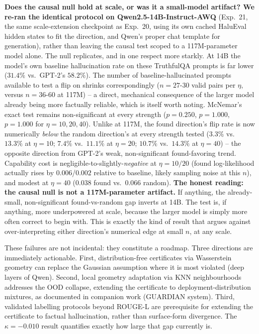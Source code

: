 \documentclass[onecolumn]{jmlr}
\begin{document}
\textbf{Does the causal null hold at scale, or was it a small-model
artifact? We re-ran the identical protocol on Qwen2.5-14B-Instruct-AWQ}
(Exp.~21, the same scale-extension checkpoint as Exp.~20, using its
own cached HaluEval hidden states to fit the direction, and Qwen's
proper chat template for generation), rather than leaving the causal
test scoped to a 117M-parameter model alone. The null replicates, and
in one respect more starkly. At 14B the model's own baseline
hallucination rate on these TruthfulQA prompts is far lower ($31.4\%$
vs.\ GPT-2's $58.2\%$). The number of baseline-hallucinated prompts
available to test a flip on shrinks correspondingly ($n=27$-$30$ valid
pairs per $\eta$, versus $n=36$-$60$ at 117M) -- a direct, mechanical
consequence of the larger model already being more factually
reliable, which is itself worth noting. McNemar's exact test remains
non-significant at every strength ($p=0.250$, $p=1.000$, $p=1.000$ for
$\eta=10,20,40$). Unlike at 117M, the found direction's flip rate is
now numerically \emph{below} the random direction's at every strength
tested ($3.3\%$ vs.\ $13.3\%$ at $\eta=10$; $7.4\%$ vs.\ $11.1\%$ at
$\eta=20$; $10.7\%$ vs.\ $14.3\%$ at $\eta=40$) -- the opposite
direction from GPT-2's weak, non-significant found-favoring trend.
Capability cost is negligible-to-slightly-\emph{negative} at
$\eta=10/20$ (found log-likelihood actually rises by $0.006$/$0.002$
relative to baseline, likely sampling noise at this $n$), and modest
at $\eta=40$ ($0.038$ found vs.\ $0.066$ random). \textbf{The honest
reading: the causal null is not a 117M-parameter artifact.} If
anything, the already-small, non-significant found-vs-random gap
inverts at 14B. The test is, if anything, more underpowered at scale,
because the larger model is simply more often correct to begin with.
This is exactly the kind of result that argues against
over-interpreting either direction's numerical edge at small $n$, at
any scale.

These failures are not incidental: they constitute a roadmap. Three
directions are immediately actionable.
First, distribution-free certificates via Wasserstein geometry can
replace the Gaussian assumption where it is most violated (deep layers
of Qwen).
Second, local geometry adaptation via KNN neighbourhoods addresses the
OOD collapse, extending the certificate to deployment-distribution
mixtures, as documented in companion work (GUARDIAN system).
Third, validated labelling protocols beyond ROUGE-L are prerequisite
for extending the certificate to factual hallucination, rather than
surface-form divergence. The $\kappa = -0.010$ result quantifies
exactly how large that gap currently is.
\end{document}

